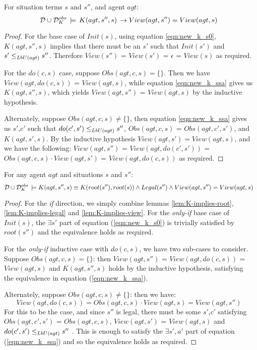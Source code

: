 \begin{lemma}
\label{lem:K-implies-view}For situation terms $s$ and $s''$, and
agent $agt$:\[
\mathcal{D}\cup\mathcal{D}_{K}^{obs}\,\models\, K(agt,s'',s)\,\rightarrow View(agt,s'')=View(agt,s)\]

\end{lemma}
\begin{proof}
For the base case of $Init(s)$, using equation \eqref{eqn:new_k_s0},
$K(agt,s'',s)$ implies that there must be an $s'$ such that $Init(s')$
and $s'\leq_{LbU(agt)}s''$. Therefore $View(s'')$ = $View(s')$
= $\epsilon$ = $View(s)$ as required.

For the $do(c,s)$ case, suppose $Obs(agt,c,s)=\{\}$. Then we have
$View(agt,do(c,s))$ = $View(agt,s)$, while equation \eqref{eqn:new_k_ssa}
gives us $K(agt,s'',s)$, which yields $View(agt,s'')$ = $View(agt,s)$
by the inductive hypothesis.

Alternately, suppose $Obs(agt,c,s)\neq\{\}$, then equation \eqref{eqn:new_k_ssa}
gives us $s'$,$c'$ such that $do(c',s')\leq_{LbU(agt)}s''$, $Obs(agt,c,s)$
= $Obs(agt,c',s')$, and $K(agt,s',s)$. By the inductive hypothesis
$View(agt,s')=View(agt,s)$, and we have the following: $View(agt,s'')$
= $View(agt,do(c',s'))$ = $Obs(agt,c,s)\cdot View(agt,s')$ = $View(agt,do(c,s))$
as required. 
\end{proof}
\medskip{}


\begin{thmext}
[{{[}{{[}{\ref{thm:k_obs_equiv}}]}]}] For any agent $agt$ and
situations $s$ and $s''$:\[
\mathcal{D}\cup\mathcal{D}_{K}^{obs}\,\models K(agt,s'',s)\equiv K(root(s''),root(s))\wedge Legal(s'')\wedge View(agt,s'')=View(agt,s)\]

\end{thmext}
\begin{proof}
For the \emph{if} direction, we simply combine lemmas \ref{lem:K-implies-root},
\ref{lem:K-implies-legal} and \ref{lem:K-implies-view}. For the
\emph{only-if} base case of $Init(s)$, the $\exists s'$ part of
equation (\ref{eqn:new_k_s0}) is trivially satisfied by $root(s'')$
and the equivalence holds as required.

For the \emph{only-if} inductive case with $do(c,s)$, we have two
sub-cases to consider. Suppose $Obs(agt,c,s)=\{\}$: then $View(agt,s'')$
= $View(agt,do(c,s))$ = $View(agt,s)$ and $K(agt,s'',s)$ holds
by the inductive hypothesis, satisfying the equivalence in equation
(\ref{eqn:new_k_ssa}).

Alternately, suppose $Obs(agt,c,s)\neq\{\}$: then we have:\[
View(agt,do(c,s))=Obs(agt,c,s)\cdot View(agt,s)=View(agt,s'')\]
 For this to be the case, and since $s''$ is legal, there must be
some $s'$,$c'$ satisfying $Obs(agt,c',s')$ = $Obs(agt,c,s)$, $View(agt,s')$
= $View(agt,s)$ and $do(c',s')\leq_{LbU(agt)}s''$ . This is enough
to satisfy the $\exists s',a'$ part of equation (\ref{eqn:new_k_ssa})
and so the equivalence holds as required. 
\end{proof}
\medskip{}


